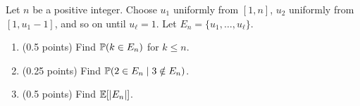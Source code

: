 \documentclass[a4paper]{report}
\begin{document}
\begin{problem}
Let $n$ be a positive integer. Choose $u_1$ uniformly from $[1,n]$, $u_2$ uniformly from $[1,u_1-1]$, and so on until $u_\ell=1$. Let $E_n=\{u_1,\ldots,u_\ell\}$.
\begin{enumerate}
\item (0.5 points) Find $\P(k\in E_n)$ for $k\leq n$.
\item (0.25 points) Find $\P(2\in E_n\mid3\notin E_n)$.
\item (0.5 points) Find $\E[|E_n|]$.
\end{enumerate}
\end{problem}
\end{document}
